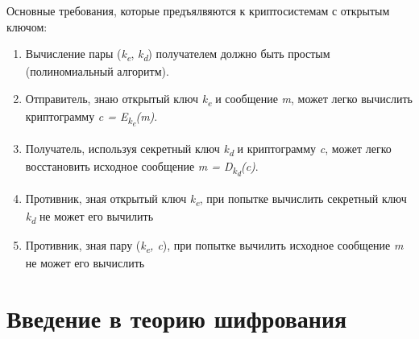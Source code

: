 Основные требования, которые предъялвяются к криптосистемам с открытым ключом:
\begin{enumerate}
	\item Вычисление пары (\textit{k\textsubscript{e}}, \textit{k\textsubscript{d}}) получателем должно быть простым (полиномиальный алгоритм).
	\item Отправитель, знаю открытый ключ \textit{k\textsubscript{e}} и сообщение \textit{m}, может легко вычислить криптограмму 
\textit{c = E\textsubscript{k\textsubscript{e}}(m)}.
	\item Получатель, используя секретный ключ \textit{k\textsubscript{d}} и криптограмму \textit{c}, может легко восстановить исходное сообщение 
\textit{m = D\textsubscript{k\textsubscript{d}}(c)}.
	\item Противник, зная открытый ключ \textit{k\textsubscript{e}}, при попытке вычислить секретный ключ \textit{k\textsubscript{d}} не может его 
вычилить
	\item Противник, зная пару (\textit{k\textsubscript{e}, c}), при попытке вычилить исходное сообщение \textit{m} не может его вычислить
\end{enumerate}

\section{Введение в теорию шифрования}

